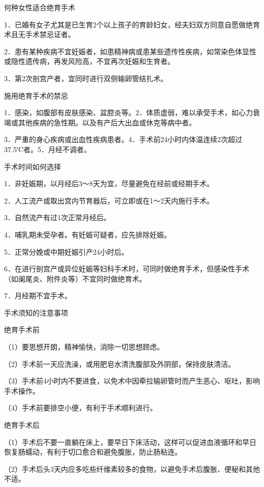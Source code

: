 \documentclass[12pt,UTF8,openany]{ctexbook}
\begin{document}
何种女性适合绝育手术


1．已婚有女子尤其是已生育2个以上孩子的育龄妇女，经夫妇双方同意自愿做绝育术且无手术禁忌证者。

2．患有某种疾病不宜妊娠者，如患精神病或患某些遗传性疾病，如常染色体显性或隐性遗传病，再发风险高，不宜再次妊娠和生育者。

3．第2次剖宫产者，宜同时进行双侧输卵管结扎术。





施用绝育手术的禁忌


1．感染，如腹部有皮肤感染、盆腔炎等。2．体质虚弱，难以承受手术，如心力衰竭或其他疾病的急性期。以及有产后大出血或休克等病中者。

3．严重的身心疾病或出血性疾病患者。4．手术前24小时内体温连续2次超过37.5℃者。5．月经不调者。





手术时间如何选择


1．非妊娠期，以月经后3～8天为宜，尽量避免在经前或经期手术。

2．人工流产或取出宫内节育器后，可立即或在1～2天内施行手术。

3．自然流产有过1次正常月经后。

4．哺乳期未受孕者。有妊娠可疑者，应先排除妊娠。

5．正常分娩或中期妊娠引产24小时后。

6．在进行剖宫产或异位妊娠等妇科手术时，可同时做绝育手术，但感染性手术（如阑尾炎、附件炎等）不宜同时做绝育术。

7．月经期不宜手术。





手术须知的注意事项


绝育手术前

（1）要思想开朗，精神愉快，消除一切思想顾虑。

（2）手术前一天应洗澡，或用肥皂水清洗腹部及外阴部，保持皮肤清洁。

（3）手术前4小时内不要进食，以免术中因牵拉输卵管时而产生恶心、呕吐，影响手术操作。

（4）手术前要排空小便，有利于手术顺利进行。

绝育手术后

（1）手术后不要一直躺在床上，要早日下床活动，这样可以促进血液循环和早日恢复肠蠕动，有利于切口愈合和避免腹胀，防止肠粘连。

（2）手术后头3天内应多吃些纤维素较多的食物，以避免手术后腹胀、便秘和其他不适。
\end{document}
